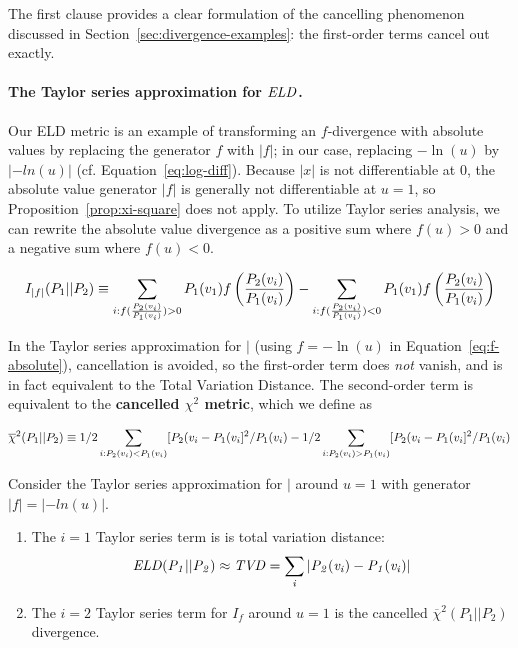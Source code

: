 {The first clause provides a clear formulation of the cancelling phenomenon discussed in Section~\ref{sec:divergence-examples}: the first-order terms cancel out exactly.


\paragraph{The Taylor series approximation for $\it{ELD}$.}

Our ELD metric is an example of transforming an $f$-divergence with absolute values by replacing the generator $f$ with $|f|$; in our case, replacing $-\ln(u)$ by $|-ln(u)|$ (cf. Equation~\eqref{eq:log-diff}). Because $|x|$ is not differentiable at 0,  the absolute value generator $|f|$ is generally not differentiable at $u=1$, so Proposition~\ref{prop:xi-square} does not apply. To utilize Taylor series analysis, we can rewrite the absolute value divergence as a positive sum where $f(u)>0$ and a negative sum where $f(u) < 0$. 

\begin{equation*} \label{eq:f-absolute}
I_{|f|}(P_{1}||P_{2}) \equiv \sum_{i:f(\frac{P_{2}(v_{i})}{P_{1}(v_{i})})>0} P_{1}(v_{1}) f\left(\frac{P_{2}(v_{i})}{P_{1}(v_{i})}\right) - \sum_{i:f(\frac{P_{2}(v_{i})}{P_{1}(v_{i})})<0} P_{1}(v_{1}) f\left(\frac{P_{2}(v_{i})}{P_{1}(v_{i})}\right)
\end{equation*}

In the Taylor series approximation for $\mid$ (using $f=-\ln(u)$ in Equation~\eqref{eq:f-absolute}), cancellation is avoided, so the first-order term does {\em not} vanish, and is in fact equivalent to the Total Variation Distance. The second-order term is equivalent to the \textbf{cancelled $\chi^2$ metric}, which we define as 

\begin{equation*}
\overline{\chi}^2(P_{1}||P_{2}) \equiv 1/2 
\sum_{i:P_{2}(v_{i}) < P_{1}(v_{i})} [P_{2}(v_{i}-P_{1}(v_{i}]^2/P_{1}(v_{i}) - 
1/2 \sum_{i:P_{2}(v_{i}) > P_{1}(v_{i})} [P_{2}(v_{i}-P_{1}(v_{i}]^2/P_{1}(v_{i})
\end{equation*}


\begin{proposition} Consider the Taylor series approximation for  $\mid$ around $u=1$ with generator $|f|=|-ln(u)|$. 
\begin{enumerate}
\item The $i=1$ Taylor series term is is total variation distance:
$$\it{ELD}(P_{1}||P_{2}) \approx  TVD =  \sum_{i} |P_{2}(v_{i})-P_{1}(v_{i})|$$
\item The $i=2$ Taylor series term for  $I_{f}$ around $u=1$ is the cancelled $\overline{\chi}^2(P_{1}||P_{2})$ divergence.
\end{enumerate}
\end{proposition}

}
